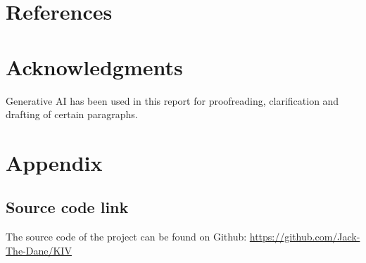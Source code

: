 \documentclass[11pt,a4paper]{article}
\begin{document}
\newpage


\setcounter{page}{1}







\newpage
\section{References}
\printbibliography[
heading=none
]
\newpage
\section{Acknowledgments}
Generative AI has been used in this report for proofreading, clarification and drafting of certain paragraphs.
\appendix
\section{Appendix}
\subsection{Source code link}
The source code of the project can be found on Github:
\url{https://github.com/Jack-The-Dane/KIV}
\end{document}
